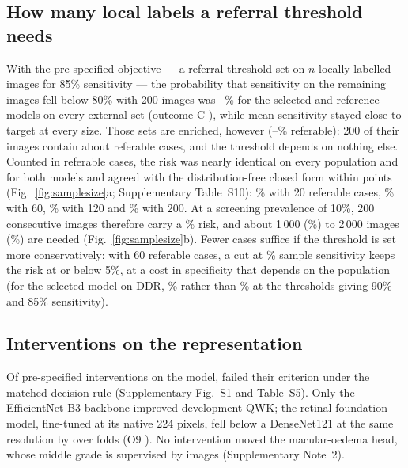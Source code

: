 \subsection{How many local labels a referral threshold needs}

With the pre-specified objective --- a referral threshold set on $n$ locally labelled images for
85\% sensitivity --- the probability that sensitivity on the remaining images fell below 80\% with
200 images was --\% for the selected and reference models
on every external set (outcome C ), while mean sensitivity stayed close to target
at every size. Those sets are enriched, however
(--\% referable): 200 of their images contain about
 referable cases, and the threshold depends on nothing else. Counted in referable cases,
the risk was nearly identical on every population and for both models and agreed with the
distribution-free closed form within  points (Fig.~\ref{fig:samplesize}a;
Supplementary Table~S10): \% with 20 referable cases, \% with 60,
\% with 120 and \% with 200. At a screening prevalence of 10\%,
200 consecutive images therefore carry a \% risk, and about 1\,000
(\%) to 2\,000 images (\%) are needed
(Fig.~\ref{fig:samplesize}b). Fewer cases suffice if the threshold is set more conservatively: with
60 referable cases, a cut at \% sample sensitivity keeps the risk at or below
5\%, at a cost in specificity that depends on the population (for the selected model on DDR,
\% rather than \% at the thresholds giving
90\% and 85\% sensitivity).

\subsection{Interventions on the representation}

Of  pre-specified interventions on the model,  failed their
criterion under the matched decision rule (Supplementary Fig.~S1 and Table~S5). Only
the EfficientNet-B3 backbone improved development QWK; the retinal foundation model, fine-tuned at
its native 224 pixels, fell below a DenseNet121 at the same resolution by 
 over  folds (O9 ). No intervention moved
the macular-oedema head, whose middle grade is supervised by  images (Supplementary
Note~2).
